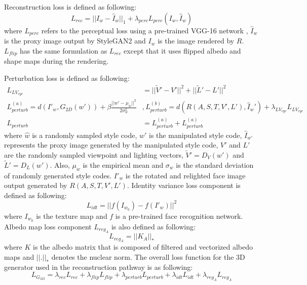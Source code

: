 Reconstruction loss is defined as following:
\begin{equation}
L_{rec} = || I_w - \hat{I}_w ||_1 + \lambda_{perc}  L_{perc}(I_w, \hat{I}_w)
\end{equation}
where $L_{perc}$ refers to the perceptual loss \cite{johnson2016perceptual} using a pre-trained VGG-16 network \cite{simonyan2015deep}, $\hat{I}_w$ is the proxy image output by StyleGAN2 and $I_w$ is the image rendered by $R$. $L_{flip}$ has the same formulation as $L_{rec}$ except that it uses flipped albedo and shape maps during the rendering.

Perturbation loss is defined as following:
\begin{equation}
    \begin{split}
    L_{LV_{cyc}} &= || \tilde{V}' - V' ||^2  + || \tilde{L}'  - L' ||^2 \\
    L^{(a)}_{perturb} = d(I'_w, G_{2D}(w')) + \beta \frac{{||w'- \mu_w||}^2}{2\sigma^2_w} &, L^{(b)}_{perturb} = d(R(A,S,T,V',L'), \hat{I}_w') + \lambda_{LV_{cyc}}L_{LV_{cyc}} \\
    L_{perturb} &= L^{(a)}_{perturb} +  L^{(a)}_{perturb}
    \end{split}
\end{equation}
where $\hat{w}$ is a randomly sampled style code, $w'$ is the manipulated style code,
$\hat{I}_{w'}$ represents the proxy image generated by the manipulated style code,
$V'$ and $L'$ are the randomly sampled viewpoint and lighting vectors, $\tilde{V}' = D_V(w')$ and $\tilde{L}' = D_L(w')$. Also, $\mu_w$ is the empirical mean and $\sigma_w$ is the standard deviation of randomly generated style codes. $I'_w$ is the rotated and relighted
face image output generated by $R(A, S, T, V', L')$. Identity variance loss component is defined as following:
\begin{equation}
    L_{idt} = || f(I_{w_0}) - f(I'_w)||^2
\end{equation}
where $I_{w_0}$ is the texture map and $f$ is a pre-trained face recognition network. Albedo map loss component $L_{reg_A}$ is also defined as following:
\begin{equation}
L_{reg_A} = || K_A ||_*
\end{equation}
where $K$ is the albedo matrix that is composed of filtered and vectorized albedo maps and $||.||_*$ denotes the nuclear norm. The overall loss function for the 3D generator used in the reconstruction pathway is as following:
\begin{equation}
L_{G_{3D}} = \lambda_{rec} L_{rec} + \lambda_{flip} L_{flip} + \lambda_{perturb} L_{perturb} + \lambda_{idt} L_{idt} +  \lambda_{reg_A} L_{reg_A}
\end{equation}


